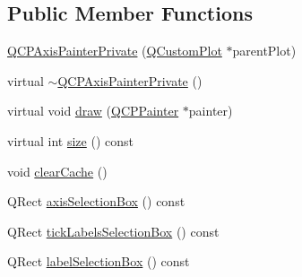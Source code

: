 \subsection*{Public Member Functions}
\begin{DoxyCompactItemize}
\item 
\hyperlink{classQCPAxisPainterPrivate_a0f14aa5c4aa83dbcd68984a7c73bf94f}{Q\+C\+P\+Axis\+Painter\+Private} (\hyperlink{classQCustomPlot}{Q\+Custom\+Plot} $\ast$parent\+Plot)
\item 
virtual \hyperlink{classQCPAxisPainterPrivate_a7c7f95313f0f78c3c3975f822a5fea35}{$\sim$\+Q\+C\+P\+Axis\+Painter\+Private} ()
\item 
virtual void \hyperlink{classQCPAxisPainterPrivate_a0207a99bdf9c4f70af20928898ddc2fc}{draw} (\hyperlink{classQCPPainter}{Q\+C\+P\+Painter} $\ast$painter)
\item 
virtual int \hyperlink{classQCPAxisPainterPrivate_a8b2dc0bd2ccbf6bd450733ec9e410a38}{size} () const 
\item 
void \hyperlink{classQCPAxisPainterPrivate_a7b6806e32c44384fd0ae4dcdaa72b1b5}{clear\+Cache} ()
\item 
Q\+Rect \hyperlink{classQCPAxisPainterPrivate_aaf93529ac60215ea020cdff5635c3e80}{axis\+Selection\+Box} () const 
\item 
Q\+Rect \hyperlink{classQCPAxisPainterPrivate_af02fc189ab8460c202eb4138c9aca516}{tick\+Labels\+Selection\+Box} () const 
\item 
Q\+Rect \hyperlink{classQCPAxisPainterPrivate_ae907476bf8cf0ecd17620575e17c06b1}{label\+Selection\+Box} () const 
\end{DoxyCompactItemize}
